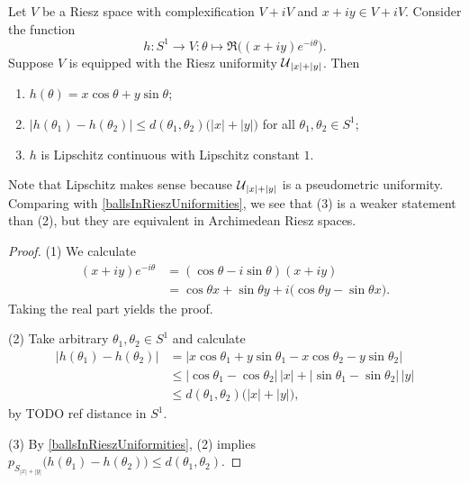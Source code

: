 \begin{lemma} \label{modulusConstructionLemma}
Let $V$ be a Riesz space with complexification $V+iV$ and $x+iy \in V+iV$. Consider the function
\[ h: S^1 \to V: \theta\mapsto \Re\big((x+iy)e^{-i\theta}\big). \]
Suppose $V$ is equipped with the Riesz uniformity $\operatorname{\mathcal{U}}_{|x|+|y|}$. Then
\begin{enumerate}
\item $h(\theta) = x\cos\theta + y\sin\theta$;
\item $\big|h(\theta_1) - h(\theta_2)\big| \leq d(\theta_1, \theta_2)\big(|x|+ |y|\big)$ for all $\theta_1,\theta_2 \in S^1$;
\item $h$ is Lipschitz continuous with Lipschitz constant $1$.
\end{enumerate}
\end{lemma}
Note that Lipschitz makes sense because $\operatorname{\mathcal{U}}_{|x|+|y|}$ is a pseudometric uniformity. Comparing with \ref{ballsInRieszUniformities}, we see that (3) is a weaker statement than (2), but they are equivalent in Archimedean Riesz spaces.
\begin{proof}
(1) We calculate
\begin{align*}
(x+iy)e^{-i\theta} &= (\cos\theta - i\sin\theta)(x+iy) \\
&= \cos\theta x + \sin\theta y + i\big(\cos\theta y - \sin\theta x\big).
\end{align*}
Taking the real part yields the proof.

(2) Take arbitrary $\theta_1, \theta_2 \in S^1$ and calculate
\begin{align*}
\big|h(\theta_1) - h(\theta_2)\big| &= |x\cos\theta_1 +y\sin\theta_1 - x\cos\theta_2 - y\sin\theta_2| \\
&\leq |\cos\theta_1 - \cos\theta_2|\,|x| + |\sin\theta_1 - \sin\theta_2|\,|y| \\
&\leq d(\theta_1, \theta_2)\big(|x|+ |y|\big),
\end{align*}
by TODO ref distance in $S^1$.

(3) By \ref{ballsInRieszUniformities}, (2) implies $p_{S_{|x|+|y|}}\big(h(\theta_1) - h(\theta_2)\big) \leq d(\theta_1, \theta_2)$.
\end{proof}


